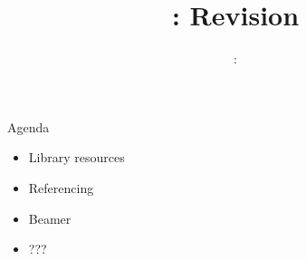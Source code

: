 \usepackage{../../beamerthemeFalmouthGamesAcademy}
\usepackage{multimedia}
\graphicspath{ {../../} }

\lstset{language=Python
}

\usepackage[normalem]{ulem}
\usepackage{wasysym}

\usepackage{pdfpages}

\usetikzlibrary{arrows,automata}




\title{\sessionnumber: Revision}
\subtitle{\modulecode: \moduletitle}

\frame{\titlepage} 

\begin{frame}{Agenda}
	\begin{itemize}
		\item Library resources
		\item Referencing
		\item Beamer
		\item ???
	\end{itemize}
\end{frame}






